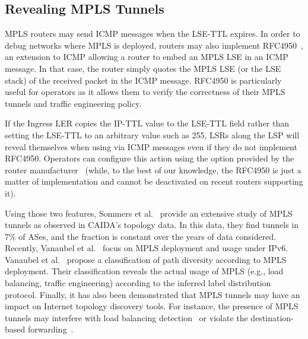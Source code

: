 \subsection{Revealing MPLS Tunnels}\label{related.revealing}
MPLS routers may send ICMP \ttlexceeded messages when the LSE-TTL expires. In
order to debug networks where MPLS is deployed, routers may also implement
RFC4950~\cite{rfc4950}, an extension to ICMP allowing a router to embed an MPLS
LSE in an ICMP \ttlexceeded message. In that case, the router simply quotes the
MPLS LSE (or the LSE stack) of the received packet in the ICMP \ttlexceeded
message. RFC4950 is particularly useful for operators as it allows them to
verify the correctness of their MPLS tunnels and traffic engineering policy.

If the Ingress LER copies the IP-TTL value to the LSE-TTL field rather than
setting the LSE-TTL to an arbitrary value such as 255, LSRs along the LSP will
reveal themselves when using \traceroute via ICMP messages even if they do not
implement RFC4950. Operators can configure this action using the \tpropagate
option provided by the router manufacturer~\cite{rfc3443} (while, to the best of
our knowledge, the RFC4950 is just a matter of implementation and cannot be
deactivated on recent routers supporting it). 

Using those two features, Sommers et al.~\cite{SOM11} provide an extensive study
of MPLS tunnels as observed in CAIDA's topology data.  In this data, they find
tunnels in 7\% of ASes, and the fraction is constant over the years of data
considered.
Recently, Vanaubel et al.~\cite{Vanaubel16} focus on MPLS deployment and usage
under IPv6.  Vanaubel et al.~\cite{Vanaubel15} propose a classification of path
diversity according to MPLS deployment.  Their classification reveals the actual
usage of MPLS (e.g., load balancing, traffic engineering) according to the
inferred label distribution protocol.  Finally, it has also been demonstrated
that MPLS tunnels may have an impact on Internet topology discovery tools.  For
instance, the presence of MPLS tunnels may interfere with load balancing
detection~\cite{BRICE07} or violate the destination-based
forwarding~\cite{Flach2012}.

